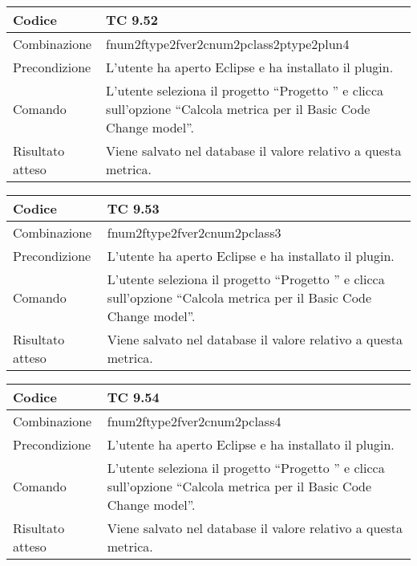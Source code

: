 \begin{table}[ht]
\begin{tabular}{|p{3cm}|p{9cm}|}
\hline
\cellcolor{lightgray}Codice				& TC 9.52								\\
\hline
\cellcolor{lightgray}Combinazione		& fnum2ftype2fver2cnum2pclass2ptype2plun4									\\
\hline
\cellcolor{lightgray}Precondizione		& L'utente ha aperto Eclipse e ha installato il plugin.		\\
\hline
\cellcolor{lightgray}Comando			& L'utente seleziona il progetto ``Progetto ''  e clicca sull'opzione ``Calcola metrica per il Basic Code Change model''.	\\
\hline
\cellcolor{lightgray}Risultato atteso	& Viene salvato nel database il valore relativo a questa metrica.\\
\hline
\end{tabular}
\end{table}

\begin{table}[ht]
\begin{tabular}{|p{3cm}|p{9cm}|}
\hline
\cellcolor{lightgray}Codice				& TC 9.53								\\
\hline
\cellcolor{lightgray}Combinazione		& fnum2ftype2fver2cnum2pclass3									\\
\hline
\cellcolor{lightgray}Precondizione		& L'utente ha aperto Eclipse e ha installato il plugin.		\\
\hline
\cellcolor{lightgray}Comando			& L'utente seleziona il progetto ``Progetto ''  e clicca sull'opzione ``Calcola metrica per il Basic Code Change model''.	\\
\hline
\cellcolor{lightgray}Risultato atteso	& Viene salvato nel database il valore relativo a questa metrica.\\
\hline
\end{tabular}
\end{table}

\begin{table}[ht]
\begin{tabular}{|p{3cm}|p{9cm}|}
\hline
\cellcolor{lightgray}Codice				& TC 9.54								\\
\hline
\cellcolor{lightgray}Combinazione		& fnum2ftype2fver2cnum2pclass4									\\
\hline
\cellcolor{lightgray}Precondizione		& L'utente ha aperto Eclipse e ha installato il plugin.		\\
\hline
\cellcolor{lightgray}Comando			& L'utente seleziona il progetto ``Progetto ''  e clicca sull'opzione ``Calcola metrica per il Basic Code Change model''.	\\
\hline
\cellcolor{lightgray}Risultato atteso	& Viene salvato nel database il valore relativo a questa metrica.\\
\hline
\end{tabular}
\end{table}

\clearpage
